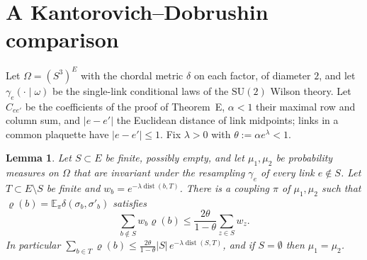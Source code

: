 \documentclass[aps,prd,twocolumn,superscriptaddress,nofootinbib,longbibliography,floatfix,amsmath,amssymb,10pt]{revtex4-2}
\newtheorem{lemma}[theorem]{Lemma}
\theoremstyle{definition}
\theoremstyle{remark}
\newcommand{\E}{\mathbb{E}}
\newcommand{\SU}{\mathrm{SU}}
\newcommand{\dist}{\operatorname{dist}}
\begin{document}
\section{A Kantorovich--Dobrushin comparison}\label{app:dobrushin}

Let $\Omega=(S^3)^E$ with the chordal metric $\delta$ on each factor, of
diameter $2$, and let $\gamma_e(\cdot\mid\omega)$ be the single-link
conditional laws of the $\SU(2)$ Wilson theory. Let $C_{ee'}$ be the
coefficients of the proof of Theorem~E, $\alpha<1$ their maximal row and
column sum, and $|e-e'|$ the Euclidean distance of link midpoints; links in a
common plaquette have $|e-e'|\le1$. Fix $\lambda>0$ with $\theta:=\alpha e^
\lambda<1$.

\begin{lemma}\label{lem:comparison}
Let $S\subset E$ be finite, possibly empty, and let $\mu_1,\mu_2$ be
probability measures on $\Omega$ that are invariant under the resampling
$\gamma_e$ of every link $e\notin S$. Let $T\subset E\setminus S$ be finite
and $w_b=e^{-\lambda\dist(b,T)}$. There is a coupling $\pi$ of $\mu_1,\mu_2$
such that $\varrho(b)=\E_\pi\delta(\sigma_b,\sigma'_b)$ satisfies
\[
\sum_{b\notin S}w_b\varrho(b)\le\frac{2\theta}{1-\theta}\sum_{z\in S}w_z .
\]
In particular $\sum_{b\in T}\varrho(b)\le\frac{2\theta}{1-\theta}|S|\,e^{-
\lambda\dist(S,T)}$, and if $S=\emptyset$ then $\mu_1=\mu_2$.
\end{lemma}
\end{document}
